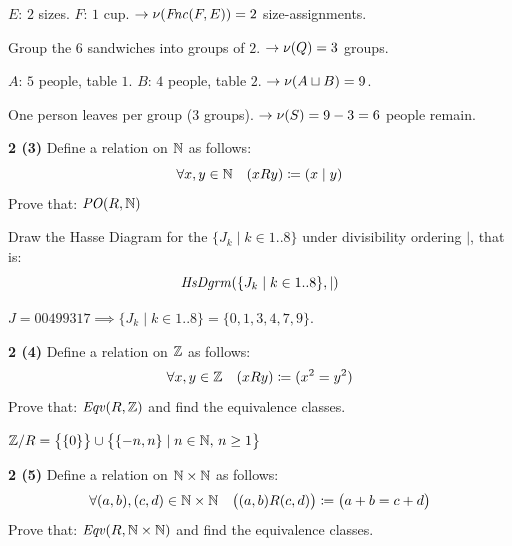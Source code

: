 \documentclass[11pt]{article}
\begin{document}
$E$: $2$ sizes. $F$: $1$ cup. $\to\nu(\mathit{Fnc}(F,E))=2$ size-assignments.

Group the $6$ sandwiches into groups of $2$. $\to\nu(Q)=3$ groups.

$A$: $5$ people, table $1$. $B$: $4$ people, table $2$. $\to\nu(A\sqcup B)=9$.

One person leaves per group ($3$ groups). $\to\nu(S)=9-3=6$ people remain.

\newpage
{}
\noindent\textbf{2 (3)} \quad Define a relation on $\mathbb{N}$ as follows:
$$\forall x,y\in\mathbb{N}\quad (xRy)\coloneqq(x\mid y)$$
Prove that: $\mathit{PO}(R,\mathbb{N})$

\vspace{4pt}
Draw the Hasse Diagram for the $\{J_k \mid k\in 1..8\}$ under divisibility ordering $\mid$, that is:
$$\mathit{HsDgrm}(\{J_k\mid k\in 1..8\},\mid)$$

\vspace{6pt}
$J=00499317 \implies \{J_k\mid k\in1..8\}=\{0,1,3,4,7,9\}$.


\begin{center}
\end{center}

\newpage

\newpage
{}
\noindent\textbf{2 (4)} \quad Define a relation on $\mathbb{Z}$ as follows:
$$\forall x,y\in\mathbb{Z}\quad (xRy)\coloneqq(x^2=y^2)$$
Prove that: $\mathit{Eqv}(R,\mathbb{Z})$ and find the equivalence classes.

\vspace{6pt}
$\mathbb{Z}/R = \big\{\{0\}\big\} \cup \big\{\{-n,n\} \mid n\in\mathbb{N},\, n\geq 1\big\}$

\newpage

\newpage
{}
\noindent\textbf{2 (5)} \quad Define a relation on $\mathbb{N}\times\mathbb{N}$ as follows:
$$\forall (a,b),(c,d)\in\mathbb{N}\times\mathbb{N} \quad \big((a,b)R(c,d)\big)\coloneqq\big(a+b=c+d\big)$$
Prove that: $\mathit{Eqv}(R,\mathbb{N}\times\mathbb{N})$ and find the equivalence classes.
\end{document}
